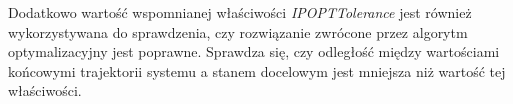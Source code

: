 Dodatkowo wartość wspomnianej właściwości \emph{IPOPTTolerance} jest również wykorzystywana do sprawdzenia, czy rozwiązanie zwrócone przez algorytm optymalizacyjny jest poprawne. Sprawdza się, czy odległość między wartościami końcowymi trajektorii systemu a stanem docelowym jest mniejsza niż wartość tej właściwości.
